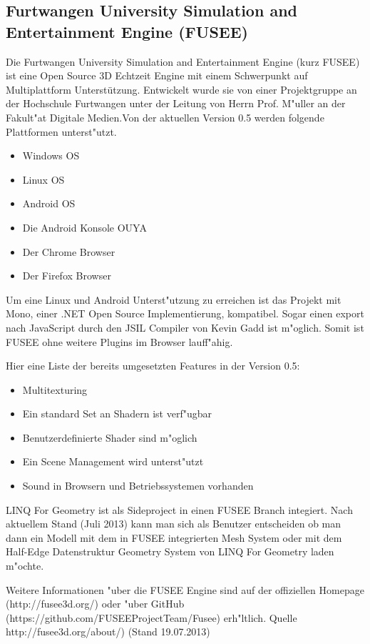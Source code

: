 \documentclass[pagesize, paper=a4, fontsize=12pt,titlepage=true, headings=small, headnosepline, abstractoff, liststotoc, nochapterprefix, plainheadsepline]{scrreprt}
\newcommand{\LFGS}{LINQ For Geometry }
\newcommand{\HES}{Half-Edge Datenstruktur }
\begin{document}
		\subsection {Furtwangen University Simulation and Entertainment Engine (FUSEE)}
			Die Furtwangen University Simulation and Entertainment Engine (kurz FUSEE) ist eine Open Source 3D Echtzeit Engine mit einem Schwerpunkt auf Multiplattform Unterstützung. Entwickelt wurde sie von einer Projektgruppe an der Hochschule Furtwangen unter der Leitung von Herrn Prof. M"uller an der Fakult"at Digitale Medien.Von der aktuellen Version 0.5 werden folgende Plattformen unterst"utzt.
\begin{itemize}
\item Windows OS
\item Linux OS
\item Android OS
\item Die Android Konsole OUYA
\item Der Chrome Browser
\item Der Firefox Browser
\end{itemize}

Um eine Linux und Android Unterst"utzung zu erreichen ist das Projekt mit Mono, einer .NET Open Source Implementierung, kompatibel. Sogar einen export nach JavaScript durch den JSIL Compiler von Kevin Gadd ist m"oglich. Somit ist FUSEE ohne weitere Plugins im Browser lauff"ahig.

Hier eine Liste der bereits umgesetzten Features in der Version 0.5:
\begin{itemize}
\item Multitexturing
\item Ein standard Set an Shadern ist verf"ugbar
\item Benutzerdefinierte Shader sind m"oglich
\item Ein Scene Management wird unterst"utzt
\item Sound in Browsern und Betriebssystemen vorhanden
\end{itemize}

\LFGS ist als Sideproject in einen FUSEE Branch integiert. Nach aktuellem Stand (Juli 2013) kann man sich als Benutzer entscheiden ob man dann ein Modell mit dem in FUSEE integrierten Mesh System oder mit dem \HES Geometry System von \LFGS laden m"ochte.

Weitere Informationen "uber die FUSEE Engine sind auf der offiziellen Homepage (http://fusee3d.org/) oder "uber GitHub (https://github.com/FUSEEProjectTeam/Fusee) erh"ltlich.
Quelle http://fusee3d.org/about/) (Stand 19.07.2013)
\end{document}
